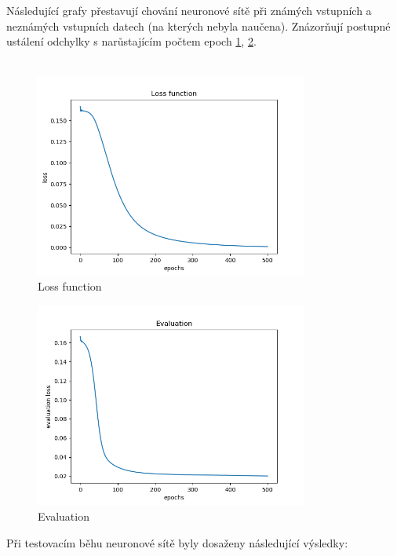 \documentclass[11pt]{article}
\begin{document}
Následující grafy přestavují chování neuronové sítě při známých
vstupních a neznámých vstupních datech (na kterých nebyla naučena).
Znázorňují postupné ustálení odchylky s narůstajícím počtem epoch
\ref{fig:loss}, \ref{fig:eval}.\\
~\\

\begin{figure}[h!]
    \centering
    \includegraphics[width=0.8\textwidth]{loss.png}
    \caption{Loss function}
    \label{fig:loss}
\end{figure}

\begin{figure}[h!]
    \centering
    \includegraphics[width=0.8\textwidth]{eval.png}
    \caption{Evaluation}
    \label{fig:eval}
\end{figure}

Při testovacím běhu neuronové sítě byly dosaženy následující výsledky:
\end{document}
